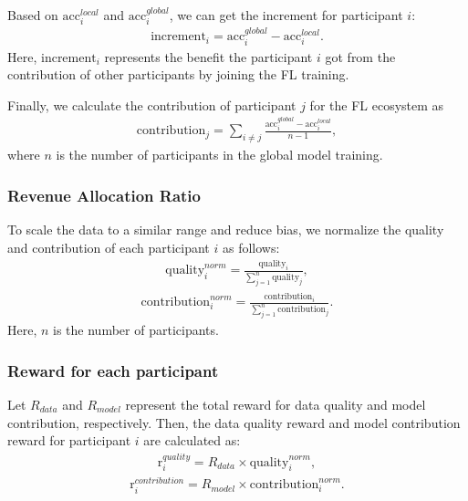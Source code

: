 \documentclass{article}
\begin{document}
Based on $\text{acc}_i^{local}$ and $\text{acc}_i^{global}$, we can get the increment for participant $i$:
\begin{equation}
\label{eq:increment_i}
\begin{aligned}
\text{increment}_i = \text{acc}_i^{global} - \text{acc}_i^{local}.
\end{aligned}
\end{equation}
Here, $\text{increment}_i$ represents the benefit the participant $i$ got from the contribution of other participants by joining the FL training. 

Finally, we calculate the contribution of participant $j$ for the FL ecosystem as
\begin{equation}
\label{eq:contribution_j}
\begin{aligned}
\text{contribution}_j = \sum_{i \neq j} \frac{\text{acc}_i^{global} - \text{acc}_i^{local}}{n-1},
\end{aligned}
\end{equation}
where $n$ is the number of participants in the global model training. 

\subsubsection{Revenue Allocation Ratio}
To scale the data to a similar range and reduce bias, we normalize the quality and contribution of each participant $i$ as follows:
\begin{equation}
\label{eq:data_quality_norm}
\begin{aligned}
\text{quality}_i^{norm} = \frac{\text{quality}_i}{\sum_{j=1}^n \text{quality}_j}, 
\end{aligned}
\end{equation}
\begin{equation}
\label{eq:contribution_norm}
\begin{aligned}
\text{contribution}_i^{norm} = \frac{\text{contribution}_i}{\sum_{j=1}^n \text{contribution}_j}.
\end{aligned}
\end{equation}
Here, $n$ is the number of participants. 

\subsubsection{Reward for each participant}
Let $R_{data}$ and $R_{model}$ represent the total reward for data quality and model contribution, respectively. Then, the data quality reward and model contribution reward for participant $i$ are calculated as:
\begin{equation}
\label{eq:data_quality_reward}
\begin{aligned}
\text{r}_i^{quality} = R_{data} \times \text{quality}_i^{norm}, 
\end{aligned}
\end{equation}
\begin{equation}
\label{eq:contribution_reward}
\begin{aligned}
 \text{r}_i^{contribution} = R_{model} \times \text{contribution}_i^{norm}.
\end{aligned}
\end{equation}
\end{document}
